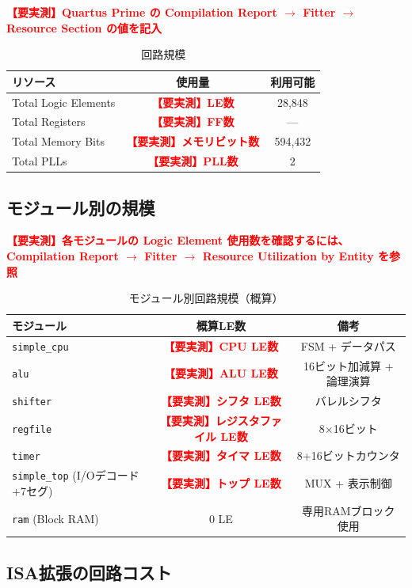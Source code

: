 \documentclass[a4paper,11pt]{ltjsarticle}
\newcommand{\measured}[1]{\textcolor{red}{\textbf{【要実測】#1}}}
\begin{document}
\measured{Quartus Prime の Compilation Report $\to$ Fitter $\to$ Resource Section の値を記入}

\begin{table}[h]
\centering
\caption{回路規模}
\begin{tabular}{lcc}
\toprule
リソース & 使用量 & 利用可能 \\
\midrule
Total Logic Elements     & \measured{LE数}   & 28,848 \\
Total Registers          & \measured{FF数}   & --- \\
Total Memory Bits        & \measured{メモリビット数} & 594,432 \\
Total PLLs               & \measured{PLL数}  & 2 \\
\bottomrule
\end{tabular}
\end{table}

\subsection{モジュール別の規模}

\measured{各モジュールの Logic Element 使用数を確認するには、
Compilation Report $\to$ Fitter $\to$ Resource Utilization by Entity を参照}

\begin{table}[h]
\centering
\caption{モジュール別回路規模（概算）}
\begin{tabular}{lcc}
\toprule
モジュール & 概算LE数 & 備考 \\
\midrule
\texttt{simple\_cpu} & \measured{CPU LE数} & FSM + データパス \\
\texttt{alu}         & \measured{ALU LE数} & 16ビット加減算 + 論理演算 \\
\texttt{shifter}     & \measured{シフタ LE数} & バレルシフタ \\
\texttt{regfile}     & \measured{レジスタファイル LE数} & 8$\times$16ビット \\
\texttt{timer}       & \measured{タイマ LE数} & 8+16ビットカウンタ \\
\texttt{simple\_top} (I/Oデコード+7セグ) & \measured{トップ LE数} & MUX + 表示制御 \\
\texttt{ram} (Block RAM) & 0 LE & 専用RAMブロック使用 \\
\bottomrule
\end{tabular}
\end{table}

\subsection{ISA拡張の回路コスト}
\end{document}
